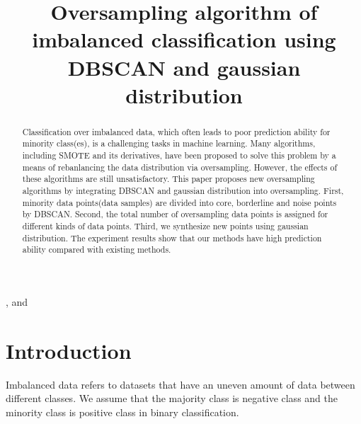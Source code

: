 \documentclass[ida]{iosart2x}
\begin{document}
\begin{frontmatter} %

%
\title{Oversampling algorithm of imbalanced classification using DBSCAN and gaussian distribution}


\author[A]{ },
and
\author[B]{ }

\address[A]{Harbin Institute of Technology }
\address[B]{Harbin Institute of Technology }

\begin{abstract}
  Classification over imbalanced data, which often leads to poor prediction ability for 
  minority class(es), is a challenging tasks in machine learning.
  Many algorithms, including SMOTE and its derivatives, 
  have been proposed to
  solve this problem by a means of rebanlancing the data distribution via oversampling. However, 
  the effects of these algorithms are still unsatisfactory. This paper proposes
  new oversampling algorithms by integrating DBSCAN and gaussian distribution into oversampling.  
  First, minority data points(data samples) are
  divided into core, borderline and noise points by DBSCAN. 
  Second, the total number of oversampling data points is
  assigned for different kinds of data points. Third, 
  we synthesize new points using gaussian distribution.
  The experiment results
  show that our methods have high prediction ability compared with existing methods.
\end{abstract}

\begin{keyword}
\end{keyword}
\end{frontmatter}




\section{Introduction}
Imbalanced data \cite{2004Editorial} refers to datasets that have an uneven 
amount of data between different classes. 
We assume that the majority class is negative class and 
the minority class is positive class in binary classification.
\end{document}
